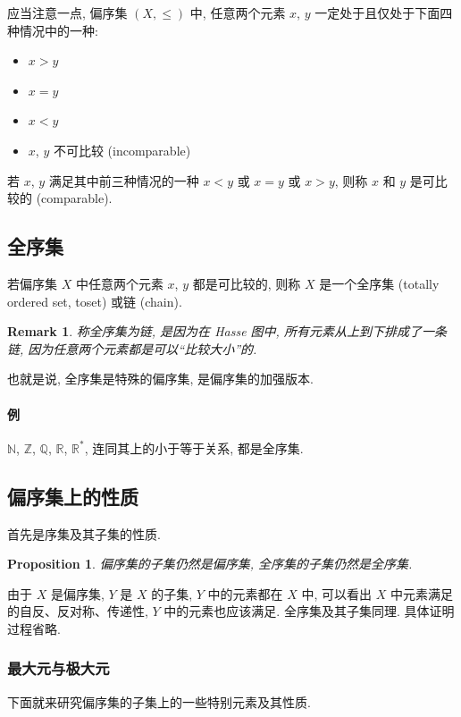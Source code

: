 \documentclass[UTF8]{ctexart}
\theoremstyle{mystyle}
\newtheorem{proposition}{Proposition}[section]
\theoremstyle{myremark}
\newtheorem*{remark}{Remark}
\theoremstyle{plain}
\newcommand{\R}{\mathbb R}
\newcommand{\Z}{\mathbb Z}
\newcommand{\N}{\mathbb N}
\newcommand{\Q}{\mathbb Q}
\begin{document}
应当注意一点, 偏序集 $ (X, \le) $ 中, 任意两个元素 $ x $, $ y $ 一定处于且仅处于下面四种情况中的一种:
\begin{itemize}
    \item $ x > y $
    \item $ x = y $
    \item $ x < y $
    \item $ x $, $ y $ 不可比较 (incomparable)
\end{itemize}

若 $ x $, $ y $ 满足其中前三种情况的一种 $ x < y $ 或 $ x = y $ 或 $ x > y $, 则称 $ x $ 和 $ y $ 是可比较的 (comparable).

\subsection{全序集}
\begin{definition}
    若偏序集 $ X $ 中任意两个元素 $ x $, $ y $ 都是可比较的, 则称 $ X $ 是一个全序集 (totally ordered set, toset) 或链 (chain).
\end{definition}

\begin{remark}
    称全序集为链, 是因为在 Hasse 图中, 所有元素从上到下排成了一条链, 因为任意两个元素都是可以``比较大小''的.
\end{remark}

也就是说, 全序集是特殊的偏序集, 是偏序集的加强版本.

\paragraph{例}
$ \N $, $ \Z $, $ \Q $, $ \R $, $ \R^* $, 连同其上的小于等于关系, 都是全序集.


\subsection{偏序集上的性质}
首先是序集及其子集的性质.

\begin{proposition}
    偏序集的子集仍然是偏序集, 全序集的子集仍然是全序集.
\end{proposition}

由于 $ X $ 是偏序集, $ Y $ 是 $ X $ 的子集, $ Y $ 中的元素都在 $ X $ 中, 可以看出 $ X $ 中元素满足的自反、反对称、传递性, $ Y $ 中的元素也应该满足. 全序集及其子集同理. 具体证明过程省略.

\subsubsection{最大元与极大元}
下面就来研究偏序集的子集上的一些特别元素及其性质.
\end{document}
